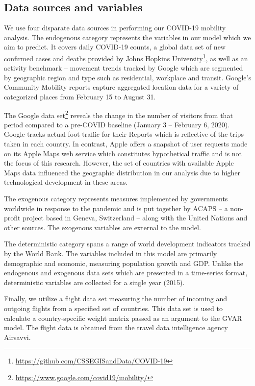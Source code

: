 \documentclass[preprint, 11pt]{elsarticle}
\newcommand{\?}{\stackrel{?}{=}}
\begin{document}
\subsection{Data sources and variables}
We use four disparate data sources in performing our COVID-19 mobility analysis. The endogenous category represents the variables in our model which we aim to predict. It covers daily COVID-19 counts, a global data set of new confirmed cases and deaths provided by Johns Hopkins University\footnote{\url{https://github.com/CSSEGISandData/COVID-19}}, as well as an activity benchmark – movement trends tracked by Google which are segmented by geographic region and type such as residential, workplace and transit. Google’s Community Mobility reports capture aggregated location data for a variety of categorized places from February 15 to August 31. 

The Google data set\footnote{\url{https://www.google.com/covid19/mobility/}} reveals the change in the number of visitors from that period compared to a pre-COVID baseline (January 3 – February 6, 2020). Google tracks actual foot traffic for their Reports which is reflective of the trips taken in each country. In contrast, Apple offers a snapshot of user requests made on its Apple Maps web service which constitutes hypothetical traffic and is not the focus of this research. However, the set of countries with available Apple Maps data influenced the geographic distribution in our analysis due to higher technological development in these areas.

The exogenous category represents measures implemented by governments worldwide in response to the pandemic and is put together by ACAPS – a non-profit project based in Geneva, Switzerland – along with the United Nations and other sources. The exogenous variables are external to the model.

The deterministic category spans a range of world development indicators tracked by the World Bank. The variables included in this model are primarily demographic and economic, measuring population growth and GDP. Unlike the endogenous and exogenous data sets which are presented in a time-series format, deterministic variables are collected for a single year (2015).

Finally, we utilize a flight data set measuring the number of incoming and outgoing flights from a specified set of countries. This data set is used to calculate a country-specific weight matrix passed as an argument to the GVAR model. The flight data is obtained from the travel data intelligence agency Airsavvi. 
\end{document}
